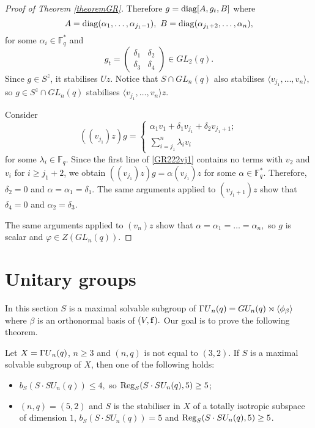 \begin{proof}[Proof of Theorem {\rm \ref{theoremGR}}]
 Therefore $g=\mathrm{diag}[A,g_t, B]$ where $$A=\mathrm{diag}(\alpha_1, \ldots, \alpha_{j_1-1}), \text{ }B=\mathrm{diag}(\alpha_{j_1+2}, \ldots, \alpha_{n}),$$  for some $\alpha_i \in \mathbb{F}_q^*$ and $$g_t = \left( \begin{matrix} \delta_1 & \delta_2 \\ \delta_3 & \delta_4  \end{matrix} \right) \in GL_2(q).$$ Since $g \in S^z$, it stabilises $Uz.$
 Notice that $S \cap GL_n(q)$ also stabilises $\langle v_{j_1}, \ldots, v_n \rangle,$ so $g \in S^z \cap GL_n(q)$ stabilises $\langle v_{j_1}, \ldots, v_n \rangle z$. 
 
 Consider 
\begin{equation}
\label{GR222vj1}
((v_{j_1})z)g= 
 \begin{cases}
 \alpha_1 v_1 + \delta_1 v_{j_1} + \delta_2 v_{j_1+1};\\
 \sum_{i=j_1}^n \lambda_i v_i
 \end{cases}
\end{equation}
 for some $\lambda_i \in \mathbb{F}_q.$ Since the first line of \eqref{GR222vj1} contains no terms with $v_2$ and $v_i$ for $i \ge j_1+2$, we obtain   
 $((v_{j_1})z)g= \alpha (v_{j_1})z $ for some $\alpha \in \mathbb{F}_q^*.$ Therefore, $\delta_2=0$ and $\alpha= \alpha_1 = \delta_1.$ The same arguments applied to $(v_{j_1+1})z$ show that
 $\delta_4=0$ and $\alpha_2=\delta_3.$ 
 
   The same arguments applied to $(v_{n})z$ show that
$\alpha= \alpha_1 = \ldots =\alpha_n,$ so $g$ is scalar and $\varphi \in Z(GL_n(q)).$
\end{proof}


\section{Unitary groups}

In this section $S$ is a maximal solvable subgroup of ${{\Gamma U}}_n(q)=GU_n(q) \rtimes \langle \phi_{\beta}\rangle$ where $\beta$ is an orthonormal basis of $(V, {\bf f}).$ Our goal is to prove the following theorem.

\begin{T2}
Let $X={{\Gamma U}}_n(q)$, $n \ge 3$ and $(n,q)$ is not equal to $(3,2).$ If $S$ is a maximal solvable subgroup of $X$, 
 then one of the following holds:
\begin{itemize}
\item  $b_S(S \cdot SU_n(q)) \le 4,$ so $\mathrm{Reg}_S(S \cdot SU_n(q),5)\ge 5$;
\item   $(n,q)=(5,2)$ and $S$ is the stabiliser in $X$ of a totally isotropic subspace of dimension $1$, $b_S(S \cdot SU_n(q)) =5$ and $\mathrm{Reg}_S(S \cdot SU_n(q),5)\ge 5$. 
\end{itemize}
\end{T2}

